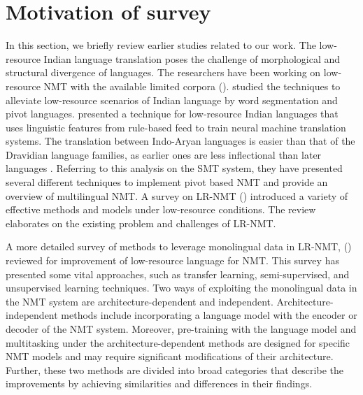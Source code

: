 \documentclass[manuscript,screen]{acmart}
\begin{document}
\section{Motivation of survey}
\label{motive}
In this section, we briefly review earlier studies related to our work. The low-resource Indian language translation poses the challenge of morphological and structural divergence of languages. The researchers have been working on low-resource NMT with the available limited corpora (\citet{philip2019baseline,choudhary2020neural, sen_hasanuzzaman_ekbal_bhattacharyya_way_2020,revanuru2017neural,ramesh2018neural,van2020optimal}). \citet{singhnmt} studied the techniques to alleviate low-resource scenarios of Indian language by word segmentation and pivot languages. \citet{singhimproving} presented a technique for low-resource Indian languages that uses linguistic features from rule-based feed to train neural machine translation systems.
The translation between Indo-Aryan languages is easier than that of the Dravidian language families, as earlier ones are less inflectional than later languages \citet{kunchukuttan2014sata}. Referring to this analysis on the SMT system, they have presented several different techniques to implement pivot based NMT and provide an overview of multilingual NMT. A survey on LR-NMT (\citet{liu2019survey}) introduced a variety of effective methods and models under low-resource conditions. The review elaborates on the existing problem and challenges of LR-NMT. 

A more detailed survey of methods to leverage monolingual data in LR-NMT, (\citet{gibadullin2019survey}) reviewed for improvement of low-resource language for NMT. This survey has presented some vital approaches, such as transfer learning, semi-supervised, and unsupervised learning techniques. Two ways of exploiting the monolingual data in the NMT system are architecture-dependent and independent. Architecture-independent methods include incorporating a language model with the encoder or decoder of the NMT system. Moreover, pre-training with the language model and multitasking under the architecture-dependent methods are designed for specific NMT models and may require significant modifications of their architecture. Further, these two methods are divided into broad categories that describe the improvements by achieving similarities and differences in their findings.
\end{document}

